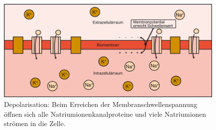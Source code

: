 \begin{figure}
    \centering
    \includegraphics[width=\textwidth]{papers/nerven/Bilder/Vorgang3.png}
    \caption{Depolarisation: Beim Erreichen der Membranschwellenspannung öffnen sich alle Natriumionenkanalproteine und viele Natriumionen strömen in die Zelle.}
    \label{fig:Depolarisation}
\end{figure}
